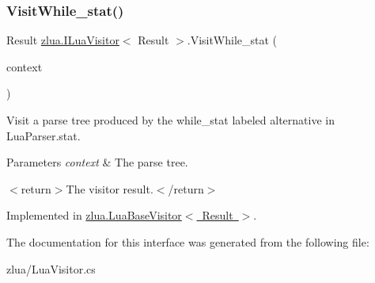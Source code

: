 \subsubsection{\texorpdfstring{Visit\+While\+\_\+stat()}{VisitWhile\_stat()}}
{\footnotesize\ttfamily Result \mbox{\hyperlink{interfacezlua_1_1_i_lua_visitor}{zlua.\+I\+Lua\+Visitor}}$<$ Result $>$.Visit\+While\+\_\+stat (\begin{DoxyParamCaption}\item[{\mbox{[}\+Not\+Null\mbox{]} \mbox{\hyperlink{classzlua_1_1_lua_parser_1_1_while__stat_context}{Lua\+Parser.\+While\+\_\+stat\+Context}}}]{context }\end{DoxyParamCaption})}



Visit a parse tree produced by the {\ttfamily while\+\_\+stat} labeled alternative in Lua\+Parser.\+stat. 


\begin{DoxyParams}{Parameters}
{\em context} & The parse tree.\\
\hline
\end{DoxyParams}
$<$return$>$The visitor result.$<$/return$>$ 

Implemented in \mbox{\hyperlink{classzlua_1_1_lua_base_visitor_af5b6f400f4f8c7b55507a798e2abef27}{zlua.\+Lua\+Base\+Visitor$<$ Result $>$}}.



The documentation for this interface was generated from the following file\+:\begin{DoxyCompactItemize}
\item 
zlua/Lua\+Visitor.\+cs\end{DoxyCompactItemize}
